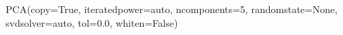 \documentclass[letterpaper,10pt,english]{sphinxmanual}
\begin{document}
\noindent{}

\begin{sphinxVerbatim}[commandchars=\\\{\}]
   
  
\end{sphinxVerbatim}

\begin{sphinxVerbatim}[commandchars=\\\{\}]
PCA(copy=True, iterated\PYGZus{}power=\PYGZsq{}auto\PYGZsq{}, n\PYGZus{}components=5, random\PYGZus{}state=None,
    svd\PYGZus{}solver=\PYGZsq{}auto\PYGZsq{}, tol=0.0, whiten=False)
\end{sphinxVerbatim}
\end{document}
